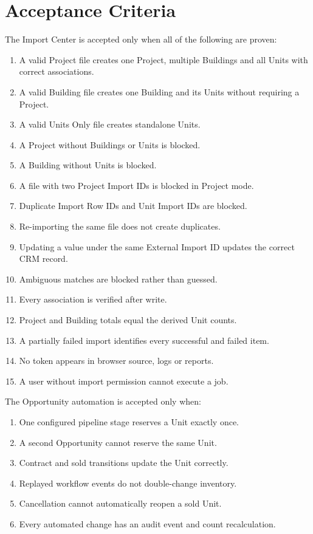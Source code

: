 \documentclass[10pt]{article}
\begin{document}
\section{Acceptance Criteria}
The Import Center is accepted only when all of the following are proven:
\begin{enumerate}
\item A valid Project file creates one Project, multiple Buildings and all Units with correct associations.
\item A valid Building file creates one Building and its Units without requiring a Project.
\item A valid Units Only file creates standalone Units.
\item A Project without Buildings or Units is blocked.
\item A Building without Units is blocked.
\item A file with two Project Import IDs is blocked in Project mode.
\item Duplicate Import Row IDs and Unit Import IDs are blocked.
\item Re-importing the same file does not create duplicates.
\item Updating a value under the same External Import ID updates the correct CRM record.
\item Ambiguous matches are blocked rather than guessed.
\item Every association is verified after write.
\item Project and Building totals equal the derived Unit counts.
\item A partially failed import identifies every successful and failed item.
\item No token appears in browser source, logs or reports.
\item A user without import permission cannot execute a job.
\end{enumerate}

The Opportunity automation is accepted only when:
\begin{enumerate}
\item One configured pipeline stage reserves a Unit exactly once.
\item A second Opportunity cannot reserve the same Unit.
\item Contract and sold transitions update the Unit correctly.
\item Replayed workflow events do not double-change inventory.
\item Cancellation cannot automatically reopen a sold Unit.
\item Every automated change has an audit event and count recalculation.
\end{enumerate}
\end{document}
